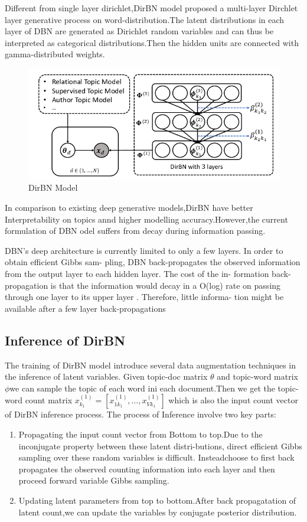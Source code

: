 Different from single layer dirichlet,DirBN model proposed a multi-layer Dirchlet layer generative process on word-distribution.The latent distributions in each layer of DBN are generated as Dirichlet
random variables and can thus be interpreted as categorical
distributions.Then  the hidden units are connected with gamma-distributed weights.

\begin{figure}[htbp]
\includegraphics[width = 13cm]{dirbn.png}
\caption{DirBN Model}
\label{fig:DirBN Model}
\end{figure}

In comparison to existing deep generative models,DirBN have better Interpretability on topics annd higher modelling accuracy.However,the current formulation of DBN odel suffers from decay during information passing.

DBN’s deep architecture is currently limited to
only a few layers. In order to obtain efficient Gibbs sam-
pling, DBN back-propagates the observed information from
the output layer to each hidden layer. The cost of the in-
formation back-propagation is that the information would
decay in a O(log) rate on passing through one layer to its
upper layer \cite{Zhou}. Therefore, little informa-
tion might be available after a few layer back-propagations
\subsection{Inference of DirBN}
The training of DirBN model introduce several data augmentation techniques in the inference of latent variables.
Given topic-doc matrix $\theta$ and topic-word matrix $\phi$we can sample the topic of each word ini each document.Then we get the topic-word count matrix $x_{k_1}^{(1)} = [x_{1k_1}^{(1)},\dots,x_{Vk_1}^{(1)}]$ which is also the input count vector of DirBN inference process.
The process of Inference involve two key parts:
\begin{enumerate}
  \item Propagating the input count vector from
Bottom to top.Due to the inconjugate property between these latent distri-butions, direct efficient Gibbs sampling over these random variables is difficult. Insteadchoose to first back propagates the observed counting information into each layer and then proceed forward variable Gibbs sampling.
\item Updating latent parameters from top to bottom.After back propagatation of latent count,we can update the variables by conjugate posterior distribution.

\end{enumerate}
